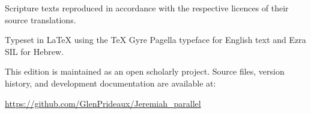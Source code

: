 Scripture texts reproduced in accordance with the respective licences
of their source translations.

\vspace{2em}

Typeset in \LaTeX{} using the \TeX{} Gyre Pagella typeface for English
text and Ezra SIL for Hebrew.

This edition is maintained as an open scholarly project.
Source files, version history, and development documentation are available at:

\href{https://github.com/GlenPrideaux/Jeremiah\_parallel}{https://github.com/GlenPrideaux/Jeremiah\_parallel}


